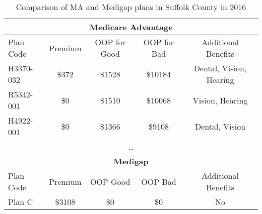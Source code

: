 \begin{table}[ht]
\centering
\scriptsize
\begin{tabular}{|l|c|c|c|c|}
\hline
\multicolumn{5}{|c|}{\textbf{Medicare Advantage}} \\
\hline
Plan Code & Premium & OOP for Good & OOP for Bad & Additional Benefits \\
\hline
H3370-032 & \$372  & \$1528 & \$10184 & Dental, Vision, Hearing   \\
R5342-001 & \$0 & \$1510 & \$10068 & Vision, Hearing           \\
H4922-001 & \$0 & \$1366 & \$9108 & Dental, Vision           \\
\multicolumn{5}{|c|}{\ldots} \\
\hline
\multicolumn{5}{|c|}{\textbf{Medigap}} \\
\hline
Plan Code & Premium & OOP Good & OOP Bad & Additional Benefits \\
\hline
Plan C & \$3108 & \$0 & \$0 & No\\
\hline
\end{tabular}
\caption{Comparison of MA and Medigap plans in Suffolk County in 2016}
\end{table}
